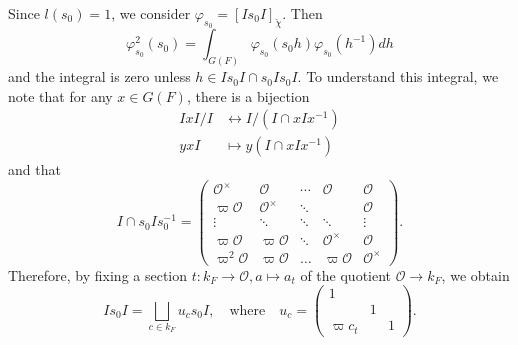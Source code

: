 \documentclass{article}
\newcommand{\cO}{\mathcal{O}}
\theoremstyle{plain}
\theoremstyle{definition}
\begin{document}
    Since $l(s_0)=1$, we consider $\varphi_{s_0}=[Is_0I]_{\check{\chi}}$. Then
    $$\varphi_{s_0}^2(s_0)=\int_{G(F)}\varphi_{s_0}(s_0h)\varphi_{s_0}(h^{-1})dh$$
    and the integral is zero unless $h\in Is_0I\cap s_0Is_0I$. To understand this integral, we note that for any $x\in G(F)$, there is a bijection
    \begin{align*}
        IxI/I&\longleftrightarrow I/(I\cap xIx^{-1})\\
        yxI&\longmapsto y(I\cap xIx^{-1})
    \end{align*}
    and that 
    \begin{equation*}
        I\cap s_0Is_0^{-1}=\begin{pmatrix}
            \cO^\times & \cO & \cdots & \cO & \cO\\
            \varpi\cO & \cO^\times & \ddots &  & \cO\\
            \vdots &\ddots & \ddots & \ddots & \vdots \\
            \varpi\cO & \varpi\cO & \ddots & \cO^\times & \cO\\
            \varpi^2\cO & \varpi\cO & \ldots & \varpi\cO & \cO^\times
        \end{pmatrix}.
    \end{equation*}
    Therefore, by fixing a section $t:k_F\rightarrow\cO, a\mapsto a_t$ of the quotient $\cO\rightarrow k_F$, we obtain
    \begin{equation*}
        Is_0I=\bigsqcup_{c\in k_F} u_cs_0I,\quad\text{where}\quad u_c=
        \begin{pmatrix}
            1 & & \\
            & 1 & \\
            \varpi c_t & & 1
        \end{pmatrix}.
    \end{equation*}
\end{document}
